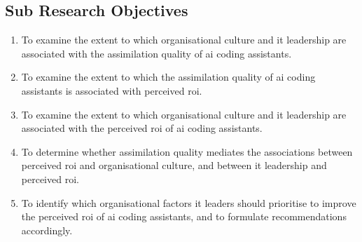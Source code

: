 
\subsection{Sub Research Objectives}
\label{sec:Sub Research Objectives}

\begin{enumerate}
	\item[RO1.] To examine the extent to which organisational culture and \gls{it} leadership are associated with the assimilation quality of \gls{ai} coding assistants.
	\item[RO2.] To examine the extent to which the assimilation quality of \gls{ai} coding assistants is associated with perceived \gls{roi}.
	\item[RO3.] To examine the extent to which organisational culture and \gls{it} leadership are associated with the perceived \gls{roi} of \gls{ai} coding assistants.
	\item[RO4.] To determine whether assimilation quality mediates the associations between perceived \gls{roi} and organisational culture, and between \gls{it} leadership and perceived \gls{roi}.
	\item[RO5.] To identify which organisational factors \gls{it} leaders should prioritise to improve the perceived \gls{roi} of \gls{ai} coding assistants, and to formulate recommendations accordingly.
\end{enumerate}

